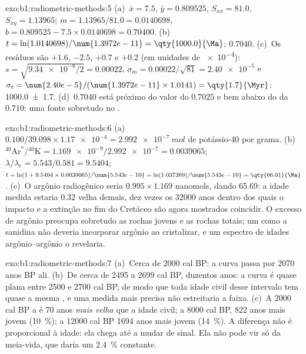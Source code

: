 \begin{solution}{exo:b1:radiometric-methods:5}
(a)~$\bar x = 7.5$, $\bar y = 0.809525$, $S_{xx} = 81.0$, $S_{xy} = 1.13965$;
$m = 1.13965/81.0 = 0.0140698$, $b = 0.809525 - 7.5 \times 0.0140698 = 0.70400$.
(b)~$t = \ln(1.0140698)/\num{1.3972e-11} = \qty{1000.0}{\Ma}$; 
$0.7040$. (c)~Os resíduos são $+1.6$, $-2.5$, $+0.7$ e $+0.2$ (em unidades de
\num{e-4}): $s = \sqrt{\num{9.34e-8}/2} = 0.00022$, $\sigma_m = 0.00022/\sqrt{81}
= \num{2.40e-5}$ e $\sigma_t = \num{2.40e-5}/(\num{1.3972e-11} \times 1.0141) =
\qty{1.7}{\Myr}$: \qty[uncertainty-mode=separate]{1000.0(17)}{\Ma}. (d)~$0.7040$ está próximo
do valor do  $0.7025$ e bem abaixo do da  $0.710$: uma fonte sobretudo no .
\end{solution}

\begin{solution}{exo:b1:radiometric-methods:6}
(a)~$0.100/39.098 \times \num{1.17e-4} = \qty{2.992e-7}{mol}$ de potássio-40 por grama.
(b)~${}^{40}\mathrm{Ar}^*/{}^{40}\mathrm{K} = \num{1.169e-9}/\num{2.992e-7}
= 0.0039065$; $\lambda/\lambda_e = 5.543/0.581 = 9.5404$; $t = \ln(1 + 9.5404
\times 0.0039065)/\num{5.543e-10} = \ln(1.037269)/\num{5.543e-10} =
\qty{66.01}{\Ma}$. (c)~O argônio radiogênico seria $0.995 \times 1.169$ nanomols, dando
\qty{65.69}{\Ma}: a idade medida estaria \qty{0.32}{\Myr} velha demais, dez vezes os
\num{32000} anos dentro dos quais o impacto e a extinção no fim do Cretáceo são agora mostrados
coincidir. O excesso de argônio preocupa sobretudo as rochas jovens e as rochas totais; um
 como a sanidina não deveria incorporar argônio ao cristalizar, e um espectro de idades
argônio--argônio o revelaria.
\end{solution}

\begin{solution}{exo:b1:radiometric-methods:7}
(a)~Cerca de \num{2000} cal BP: a curva passa por \num{2070} anos BP ali. (b)~De cerca de
\num{2495} a \num{2699} cal BP, duzentos anos: a curva é quase plana entre \num{2500} e
\num{2700} cal BP, de modo que toda idade civil desse intervalo tem quase a mesma , e uma medida mais precisa não estreitaria a faixa. (c)~A \num{2000} cal BP a  é \num{70} anos \emph{mais velha} que a idade civil; a \num{8000} cal BP,
\num{822} anos mais jovem (\qty{10}{\percent}); a \num{12000} cal BP \num{1694} anos mais jovem
(\qty{14}{\percent}). A diferença não é proporcional à idade: ela chega até a mudar de sinal.
Ela não pode vir só da meia-vida, que daria um \qty{2.4}{\percent} constante.
\end{solution}

